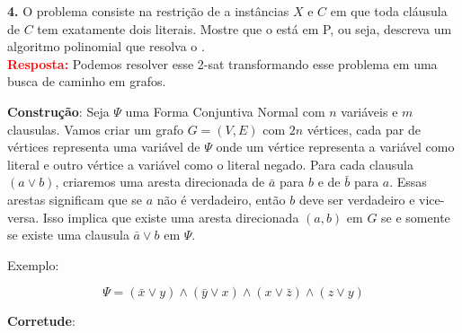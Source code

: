 
\noindent\textbf{4.} O problema  consiste na restrição de  a instâncias $X$ e $C$ em que toda cláusula de $C$ tem exatamente dois literais. Mostre que o  está em P, ou seja, descreva um algoritmo polinomial que resolva o .\\[6pt]
\textcolor{red}{\textbf{Resposta:}} Podemos resolver esse 2-sat transformando esse problema em uma busca de caminho em grafos.

\textbf{Construção}: Seja $\Psi$ uma Forma Conjuntiva Normal com $n$ variáveis e $m$ clausulas. Vamos criar um grafo $G = (V, E)$ com $2n$ vértices, cada par de vértices representa uma variável de $\Psi$ onde um vértice representa a variável como literal e outro vértice a variável como o literal negado. Para cada clausula $(a \vee b)$, criaremos uma aresta direcionada de $\bar{a}$ para $b$ e de $\bar{b}$ para $a$. Essas arestas significam que se $a$ não é verdadeiro, então $b$ deve ser verdadeiro e vice-versa. Isso implica que existe uma aresta direcionada $(a,b)$ em $G$ se e somente se existe uma clausula $\bar{a} \vee b$ em $\Psi$.

Exemplo:

\[\Psi = (\bar{x} \vee y) \wedge (\bar{y} \vee x) \wedge (x \vee \bar{z}) \wedge (z \vee y) \]

\begin{figure}[H]  
  \centering  
\end{figure}

\textbf{Corretude}:

